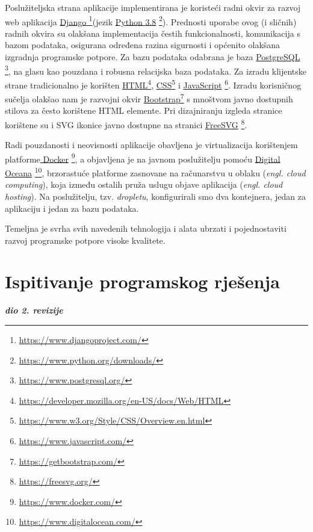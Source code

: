 			Poslužiteljska strana aplikacije implementirana je koristeći radni okvir za razvoj web aplikacija \underline{Django } \footnote {\url{https://www.djangoproject.com/}}(jezik \underline{Python 3.8} \footnote {\url{https://www.python.org/downloads/}}). Prednosti uporabe ovog (i sličnih) radnih okvira su olakšana implementacija čestih funkcionalnosti, komunikacija s bazom podataka, osigurana određena razina sigurnosti i općenito olakšana izgradnja programske potpore. Za bazu podataka odabrana je baza \underline{PostgreSQL }\footnote {\url{https://www.postgresql.org/}},  na glasu kao pouzdana i robusna relacijska baza podataka.
			Za izradu klijentske strane tradicionalno je korišten \underline{HTML}\footnote {\url{https://developer.mozilla.org/en-US/docs/Web/HTML}}, \underline{CSS}\footnote {\url{https://www.w3.org/Style/CSS/Overview.en.html}} i \underline{JavaScript} \footnote {\url{	https://www.javascript.com/}}. Izradu korisničnog sučelja olakšao nam je razvojni okvir \underline{Bootstrap}\footnote {\url{https://getbootstrap.com/}} s mnoštvom javno dostupnih stilova za često korištene HTML elemente. Pri dizajniranju izgleda stranice korištene su i SVG ikonice javno dostupne na stranici \underline{FreeSVG} \footnote {\url{https://freesvg.org/}}. 
		
			Radi pouzdanosti i neovisnosti aplikacije obavljena je virtualizacija korištenjem platforme\underline{ Docker} \footnote {\url{https://www.docker.com/}}, a objavljena je na javnom poslužitelju pomoću \underline{Digital Oceana} \footnote {\url{https://www.digitalocean.com/}}, brzorastuće platforme zasnovane na računarstvu u oblaku (\textit{engl. cloud computing}), koja između ostalih pruža uslugu objave aplikacija (\textit{engl. cloud hosting}). Na poslužitelju, tzv. \textit {dropletu}, konfigurirali smo dva kontejnera, jedan za aplikaciju i jedan za bazu podataka. \newline

		
			
			Temeljna je svrha svih navedenih tehnologija i alata ubrzati i pojednostaviti razvoj programske potpore visoke kvalitete.
					
			\eject 
		
	
		\section{Ispitivanje programskog rješenja}
			
			\textbf{\textit{dio 2. revizije}}\\
			
